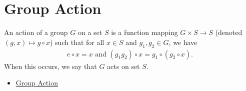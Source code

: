 \chapter{Group Action}\label{chp:2_1}



\begin{definition}{}{}
    An action of a group $G$ on a set $S$ is a function mapping $G\times S\rightarrow S$
    (denoted $(g,x)\mapsto g\circ x$) such that for all $x\in S$ and $g_1,g_2\in G$,
    we have
    \begin{align*}
        e\circ x=x\text{ and } (g_1g_2)\circ x=g_1\circ(g_2\circ x).
    \end{align*}
    When this occurs, we say that $G$ acts on set $S$.
\end{definition}






\begin{itemize}
    \item \href{https://faculty.etsu.edu/gardnerr/5410/notes/II-4.pdf}{Group Action}
\end{itemize}